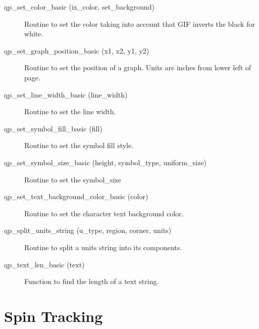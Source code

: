 \begin{description}
\label{r:qp.set.color.basic}
\item[qp_set_color_basic (ix_color, set_background)  ] \Newline 
Routine to set the color taking into account that GIF
inverts the black for white.

\label{r:qp.set.graph.position.basic}
\item[qp_set_graph_position_basic (x1, x2, y1, y2)] \Newline 
Routine to set the position of a graph.
Units are inches from lower left of page.

\label{r:qp.set.line.width.basic}
\item[qp_set_line_width_basic (line_width)] \Newline 
Routine to set the line width.

\label{r:qp.set.symbol.fill.basic}
\item[qp_set_symbol_fill_basic (fill)] \Newline 
Routine to set the symbol fill style.

\label{r:qp.set.symbol.size.basic}
\item[qp_set_symbol_size_basic (height, symbol_type, uniform_size)] \Newline 
Routine to set the symbol_size

\label{r:qp.set.text.background.color.basic}
\item[qp_set_text_background_color_basic (color)] \Newline 
Routine to set the character text background color.

\label{r:qp.split.units.string}
\item[qp_split_units_string (u_type, region, corner, units)] \Newline 
     Routine to split a units string into its components.

\label{r:qp.text.len.basic}
\item[qp_text_len_basic (text)] \Newline 
Function to find the length of a text string.

\end{description}

\section{Spin Tracking}
\label{r:spin}    

